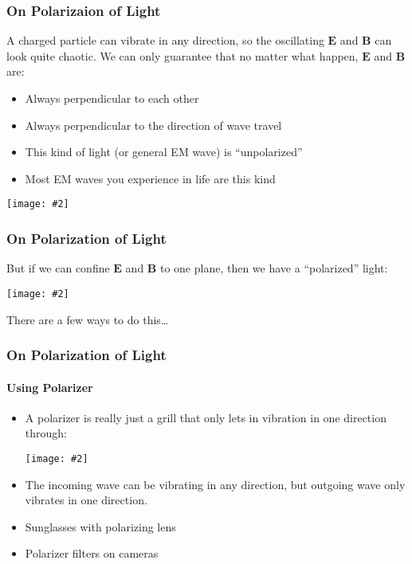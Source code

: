 \documentclass[compress,aspectratio=169]{beamer}
\newcommand{\pic}[2]{\texttt{[image: \#2]}}
\newcommand{\mb}[1]{\mathbf{#1}}
\begin{document}
\begin{frame}
  \frametitle{On Polarizaion of Light}

  A charged particle can vibrate in any direction, so the oscillating $\mb{E}$
  and $\mb{B}$ can look quite chaotic. We can only guarantee that no matter
  what happen, $\mb{E}$ and $\mb{B}$ are:
  \begin{itemize}
  \item Always perpendicular to each other
  \item Always perpendicular to the direction of wave travel
  \item This kind of light (or general EM wave) is ``unpolarized''
  \item Most EM waves you experience in life are this kind
  \end{itemize}
  \begin{center}
    \pic{0.7}{graphics/T1Zlt.png}
  \end{center}
\end{frame}


\begin{frame}
  \frametitle{On Polarization of Light}
  But if we can confine $\mb{E}$ and $\mb{B}$ to one plane, then we have a
  ``polarized'' light:
  \begin{center}
    \pic{0.4}{graphics/em-20field.jpg}
  \end{center}
  There are a few ways to do this\ldots
\end{frame}

\begin{frame}
  \frametitle{On Polarization of Light}
  \framesubtitle{Using Polarizer}
  \begin{itemize}
  \item A polarizer is really just a grill that only lets in vibration in one
    direction through:
    \begin{center}
      \pic{0.45}{graphics/polarizerfencemodel600.jpg}
    \end{center}
  \item The incoming wave can be vibrating in any direction, but outgoing wave
    only vibrates in one direction.
  \item Sunglasses with polarizing lens
  \item Polarizer filters on cameras
  \end{itemize}
\end{frame}
\end{document}
